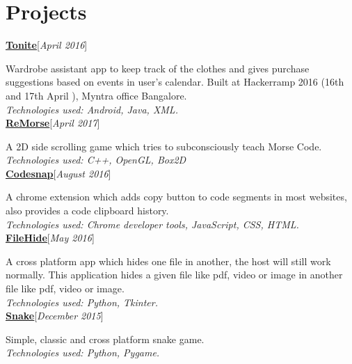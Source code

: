 \documentclass[11pt]{article}
\begin{document}
\section{Projects}

\textbf{\underline{\large\href{https://github.com/abhijith0505/Tonite}{Tonite}}}\hfill[\textit{April 2016}]\par
Wardrobe assistant app to keep track of the clothes and gives purchase suggestions based on events in user's calendar. Built at Hackerramp 2016 (16th and 17th April ), Myntra office Bangalore.\\
\textit{Technologies used:  Android, Java, XML.}\smallskip\\
\textbf{\underline{\large\href{https://github.com/RaghavaDhanya/ReMorse}{ReMorse}}}\hfill[\textit{April 2017}]\par
A 2D side scrolling game which tries to subconsciously teach Morse Code.\\
\textit{Technologies used:  C++, OpenGL, Box2D}\smallskip\\
\textbf{\underline{\large\href{https://github.com/RaghavaDhanya/Codesnap}{Codesnap}}}\hfill[\textit{August 2016}]\par
A chrome extension which adds copy button to code segments in most websites, also provides a code clipboard history.\\
\textit{Technologies used: Chrome developer tools, JavaScript, CSS, HTML. }\smallskip\\
\textbf{\underline{\large\href{https://github.com/RaghavaDhanya/FileHide}{FileHide}}}\hfill[\textit{May 2016}]\par
A cross platform app which hides one file in another, the host will still work normally. This application hides a given file like pdf, video or image in another file like pdf, video or image.\\
\textit{Technologies used: Python, Tkinter.}\smallskip\\
\textbf{\underline{\large\href{https://github.com/RaghavaDhanya/Snake}{Snake}}}\hfill[\textit{December 2015}]\par
Simple, classic and cross platform snake game.\\
\textit{Technologies used: Python, Pygame.}

\end{document}

